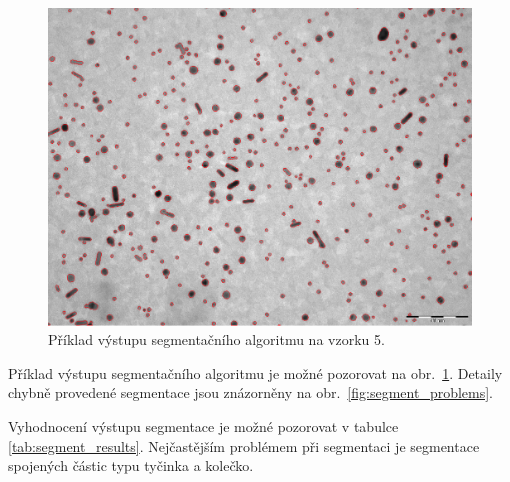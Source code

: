 \documentclass[11pt,twoside,a4paper,table]{book}
\begin{document}
\begin{figure}[ht]
	\centering
	\includegraphics[width=\textwidth]{figures/segment_result.png}	
	\caption{Příklad výstupu segmentačního algoritmu na vzorku 5.}
	\label{fig:segment_result}
\end{figure}

Příklad výstupu segmentačního algoritmu je možné pozorovat na obr.~\ref{fig:segment_result}. Detaily chybně provedené segmentace jsou znázorněny na obr.~\ref{fig:segment_problems}. 

Vyhodnocení výstupu segmentace je možné pozorovat v tabulce \ref{tab:segment_results}. Nejčastějším problémem při segmentaci je segmentace spojených částic typu tyčinka a kolečko.  
\end{document}

